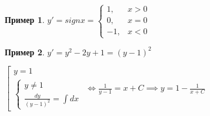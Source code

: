 \documentclass{report}
\theoremstyle{definition}
\newtheorem{example}{Пример}
\begin{document}
\begin{example}
    $y'=sign x = \left\{\begin{array}{rl}
            1,  & x > 0 \\
            0,  & x = 0 \\
            -1, & x < 0
        \end{array}\right.$
\end{example}

\begin{example}
    $y' = y^2 - 2y + 1 = (y-1)^2$

    $\left[\begin{array}{l}
            y = 1 \\
            \left\{\begin{array}{l}
                       y \ne 1 \\
                       \frac{dy}{(y - 1)^2} = \int dx
                   \end{array}\right.
        \end{array}\right. \iff \frac{1}{y-1} = x + C \implies y = 1 - \frac{1}{x + C}$
\end{example}
\end{document}
